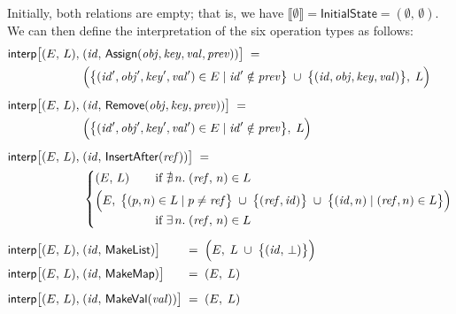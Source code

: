 \noindent
Initially, both relations are empty; that is, we have $\llbracket\emptyset\rrbracket = \mathsf{InitialState} = (\emptyset,\, \emptyset)$.
We can then define the interpretation of the six operation types as follows:
\begin{align*}
    \mathsf{interp}\big[(E,\, L),\; &(\mathit{id},\, \mathsf{Assign}(\mathit{obj}, \mathit{key}, \mathit{val}, \mathit{prev})) \big] \;=\\
    &\Big( \big\{ (\mathit{id}', \mathit{obj}', \mathit{key}', \mathit{val}') \in E \mid
    \mathit{id}' \notin \mathit{prev} \big\} \;\cup\;
    \big\{ (\mathit{id}, \mathit{obj}, \mathit{key}, \mathit{val}) \big\},\; L \Big) \\[5pt]
    \mathsf{interp}\big[(E,\, L),\; &(\mathit{id},\, \mathsf{Remove}(\mathit{obj}, \mathit{key}, \mathit{prev})) \big] \;=\\
    &\Big( \big\{ (\mathit{id}', \mathit{obj}', \mathit{key}', \mathit{val}') \in E \mid
    \mathit{id}' \notin \mathit{prev} \big\},\; L \Big) \\[5pt]
    \mathsf{interp}\big[(E,\, L),\; &(\mathit{id},\, \mathsf{InsertAfter}(\mathit{ref})) \big] \;=\\
    &\left\{
        \arraycolsep=0pt \def\arraystretch{1.2}
        \begin{array}{ll}
            (E,\, L) & \text{if } \nexists\,n.\; (\mathit{ref},\, n) \in L\\[3pt]
            \Big(E,\; \big\{ (p,n) &\;\in L \mid p \neq \mathit{ref} \big\} \;\cup\;
            \big\{ (\mathit{ref}, \mathit{id}) \big\} \;\cup\;
            \big\{ (\mathit{id}, n) \mid (\mathit{ref}, n) \in L \big\} \Big)\\
            & \text{if } \exists\,n.\; (\mathit{ref},\,n) \in L
        \end{array} \right. \\[5pt]
    \mathsf{interp}\big[(E,\, L),\; &(\mathit{id},\, \mathsf{MakeList}) \big] \hspace{21.1pt}=\;
    \Big( E,\; L \;\cup\; \big\{(\mathit{id},\, \bot)\big\}\Big) \\[1pt]
    \mathsf{interp}\big[(E,\, L),\; &(\mathit{id},\, \mathsf{MakeMap}) \big] \hspace{17.6pt}=\; (E,\; L) \\[5pt]
    \mathsf{interp}\big[(E,\, L),\; &(\mathit{id},\, \mathsf{MakeVal}(\mathit{val})) \big] \;=\; (E,\; L)
\end{align*}

